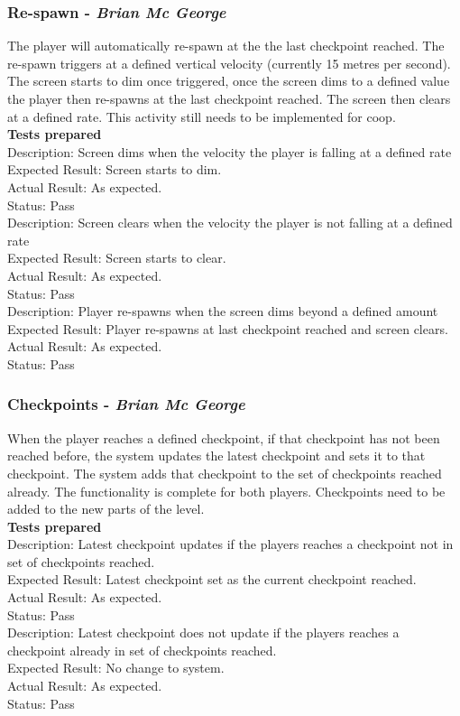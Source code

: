 \documentclass[a4paper,10pt]{article}
\begin{document}
\subsubsection{Re-spawn - \textit{Brian Mc George}}
The player will automatically re-spawn at the the last checkpoint reached. The re-spawn triggers at a defined vertical velocity (currently 15 metres per second). The screen starts to dim once triggered, once the screen dims to a defined value the player then re-spawns at the last checkpoint reached. The screen then clears at a defined rate. This activity still needs to be implemented for coop.
\smallskip\\\textbf{Tests prepared}\\
Description: Screen dims when the velocity the player is falling at a defined rate\\
Expected Result: Screen starts to dim.\\
Actual Result: As expected.\\
Status: Pass
\smallskip\\
Description: Screen clears when the velocity the player is not falling at a defined rate\\
Expected Result: Screen starts to clear.\\
Actual Result: As expected.\\
Status: Pass
\smallskip\\
Description: Player re-spawns when the screen dims beyond a defined amount\\
Expected Result: Player re-spawns at last checkpoint reached and screen clears.\\
Actual Result: As expected.\\
Status: Pass
\subsubsection{Checkpoints - \textit{Brian Mc George}}
When the player reaches a defined checkpoint, if that checkpoint has not been reached before, the system updates the latest checkpoint and sets it to that checkpoint. The system adds that checkpoint to the set of checkpoints reached already. The functionality is complete for both players. Checkpoints need to be added to the new parts of the level.
\smallskip\\\textbf{Tests prepared}\\
Description: Latest checkpoint updates if the players reaches a checkpoint not in set of checkpoints reached.\\
Expected Result: Latest checkpoint set as the current checkpoint reached.\\
Actual Result: As expected.\\
Status: Pass
\smallskip\\
Description: Latest checkpoint does not update if the players reaches a checkpoint already in set of checkpoints reached.\\
Expected Result: No change to system.\\
Actual Result: As expected.\\
Status: Pass
\end{document}
